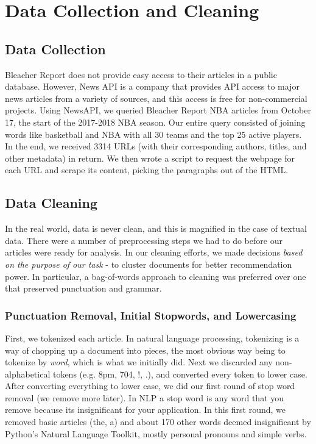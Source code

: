 \documentclass[11pt]{article}
\begin{document}
\section{Data Collection and Cleaning}
\subsection{Data Collection}
Bleacher Report does not provide easy access to their articles in a public database.  However, News API is a company that provides API access to major news articles from a variety of sources, and this access is free for non-commercial projects. Using NewsAPI, we queried Bleacher Report NBA articles from October 17, the start of the 2017-2018 NBA season. Our entire query consisted of joining words like basketball and NBA with all 30 teams and the top 25 active players.  In the end, we received 3314 URLs (with their corresponding authors, titles, and other metadata) in return.  We then wrote a script to request the webpage for each URL and scrape its content, picking the paragraphs out of the HTML.

\subsection{Data Cleaning}
In the real world, data is never clean, and this is magnified in the case of textual data. There were a number of preprocessing steps we had to do before our articles were ready for analysis. In our cleaning efforts, we made decisions \textit{based on the purpose of our task} - to cluster documents for better recommendation power.  In particular, a bag-of-words approach to cleaning was preferred over one that preserved punctuation and grammar.  \\

\subsubsection{Punctuation Removal, Initial Stopwords, and Lowercasing}
First, we tokenized each article. In natural language processing, tokenizing is a way of chopping up a document into pieces, the most obvious way being to tokenize by \textit{word}, which is what we initially did.  Next we discarded any non-alphabetical tokens (e.g. 8pm, 704, !, .), and converted every token to lower case.  After converting everything to lower case, we did our first round of stop word removal (we remove more later).  In  NLP a stop word is any word that you remove because its insignificant for your application. In this first round, we removed basic articles (the, a) and about 170 other words deemed insignificant by Python's Natural Language Toolkit, mostly personal pronouns and simple verbs.
\end{document}
